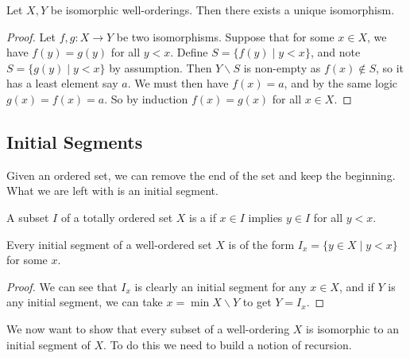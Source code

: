 \documentclass[a4paper, 10pt, twocolumn]{amsart}
\begin{document}
\begin{proposition}
  Let $X, Y$ be isomorphic well-orderings. Then there exists a unique isomorphism.
\end{proposition}
\begin{proof}
  Let $f, g: X \rightarrow Y$ be two isomorphisms. Suppose that for some $x \in X$, we have $f(y) = g(y)$ for all $y < x$. Define $S = \{f(y) \mid y < x\}$, and note $S = \{g(y) \mid y < x\}$ by assumption.
  Then $Y \backslash S$ is non-empty as $f(x) \not \in S$, so it has a least element say $a$. We must then have $f(x) = a$, and by the same logic $g(x) = f(x) = a$. So by induction $f(x) = g(x)$ for all $x \in X$.
\end{proof}

\subsection{Initial Segments}

Given an ordered set, we can remove the end of the set and keep the beginning. What we are left with is an initial segment.

\begin{definition}
  A subset $I$ of a totally ordered set $X$ is a  if $x \in I$ implies $y \in I$ for all $y < x$.
\end{definition}

\begin{proposition}
  Every initial segment of a well-ordered set $X$ is of the form $I_x = \{y \in X \mid y < x\}$ for some $x$.
\end{proposition}
\begin{proof}
  We can see that $I_x$ is clearly an initial segment for any $x \in X$, and if $Y$ is any initial segment, we can take $x = \min X \backslash Y$ to get $Y = I_x$.
\end{proof}

We now want to show that every subset of a well-ordering $X$ is isomorphic to an initial segment of $X$. To do this we need to build a notion of recursion.

\end{document}
